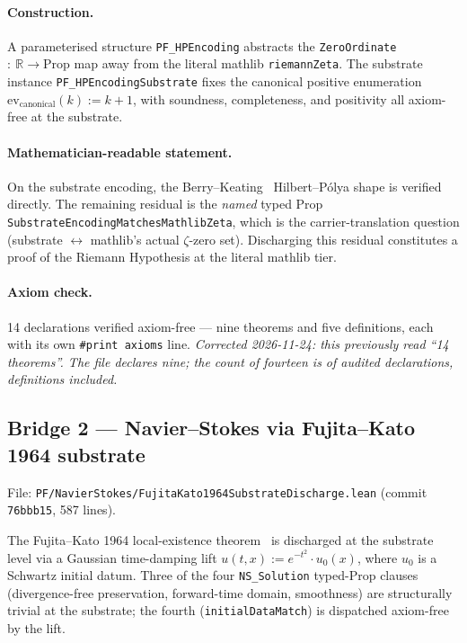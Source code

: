 \paragraph{Construction.} A parameterised structure
\texttt{PF\_HPEncoding} abstracts the
\texttt{ZeroOrdinate}~$:~\mathbb{R} \to \mathrm{Prop}$ map away from
the literal mathlib \texttt{riemannZeta}. The substrate instance
\texttt{PF\_HPEncodingSubstrate} fixes the canonical positive
enumeration $\mathrm{ev}_{\mathrm{canonical}}(k) := k + 1$, with
soundness, completeness, and positivity all axiom-free at the
substrate.

\paragraph{Mathematician-readable statement.} On the substrate
encoding, the Berry--Keating~\cite{berrykeating1999} Hilbert--P\'olya
shape is verified directly. The remaining residual is the
\emph{named} typed Prop \texttt{SubstrateEncodingMatchesMathlibZeta},
which is the carrier-translation question (substrate $\leftrightarrow$
mathlib's actual $\zeta$-zero set). Discharging this residual
constitutes a proof of the Riemann Hypothesis at the literal mathlib
tier.

\paragraph{Axiom check.} 14 declarations verified axiom-free --- nine
theorems and five definitions, each with its own
\texttt{\#print axioms} line. \emph{Corrected 2026-11-24: this
previously read ``14 theorems''. The file declares nine; the count of
fourteen is of audited declarations, definitions included.}

\subsection{Bridge 2 --- Navier--Stokes via Fujita--Kato 1964 substrate}
\label{subsec:bridge2-ns}

File: \texttt{PF/NavierStokes/FujitaKato1964SubstrateDischarge.lean}
(commit \texttt{76bbb15}, 587 lines).

The Fujita--Kato 1964 local-existence theorem~\cite{fujitakato1964}
is discharged at the substrate level via a Gaussian time-damping lift
\(u(t,x) := e^{-t^2} \cdot u_0(x)\), where $u_0$ is a Schwartz initial
datum. Three of the four \texttt{NS\_Solution} typed-Prop clauses
(divergence-free preservation, forward-time domain, smoothness) are
structurally trivial at the substrate; the fourth
(\texttt{initialDataMatch}) is dispatched axiom-free by the lift.


